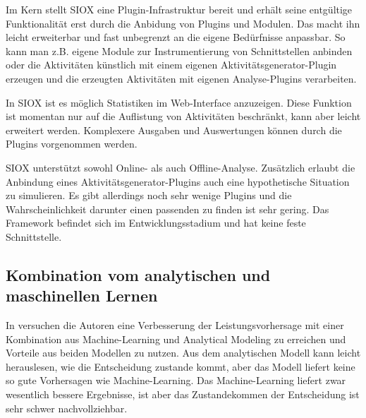 Im Kern stellt SIOX eine Plugin-Infrastruktur bereit und erhält seine entgültige Funktionalität erst durch die Anbidung von Plugins und Modulen. 
Das macht ihn leicht erweiterbar und fast unbegrenzt an die eigene Bedürfnisse anpassbar. 
So kann man z.B. eigene Module zur Instrumentierung von Schnittstellen anbinden oder die Aktivitäten künstlich mit einem eigenen Aktivitätsgenerator-Plugin erzeugen und die erzeugten Aktivitäten mit eigenen Analyse-Plugins verarbeiten.

In SIOX ist es möglich Statistiken im Web-Interface anzuzeigen. 
Diese Funktion ist momentan nur auf die Auflistung von Aktivitäten beschränkt, kann aber leicht erweitert werden. 
Komplexere Ausgaben und Auswertungen können durch die Plugins vorgenommen werden.

SIOX unterstützt sowohl Online- als auch Offline-Analyse. 
Zusätzlich erlaubt die Anbindung eines Aktivitätsgenerator-Plugins auch eine hypothetische Situation zu simulieren. 
Es gibt allerdings noch sehr wenige Plugins und die Wahrscheinlichkeit darunter einen passenden zu finden ist sehr gering. 
Das Framework befindet sich im Entwicklungsstadium und hat keine feste Schnittstelle.


\subsection{Kombination vom analytischen und maschinellen Lernen}
In \cite{Didona:2015:EPP:2668930.2688047} versuchen die Autoren eine Verbesserung der Leistungsvorhersage mit einer Kombination aus Machine-Learning und Analytical Modeling zu erreichen und Vorteile aus beiden Modellen zu nutzen. 
Aus dem analytischen Modell kann leicht herauslesen, wie die Entscheidung zustande kommt, aber das Modell liefert keine so gute Vorhersagen wie Machine-Learning. 
Das Machine-Learning liefert zwar wesentlich bessere Ergebnisse, ist aber das Zustandekommen der Entscheidung ist sehr schwer nachvollziehbar. 
